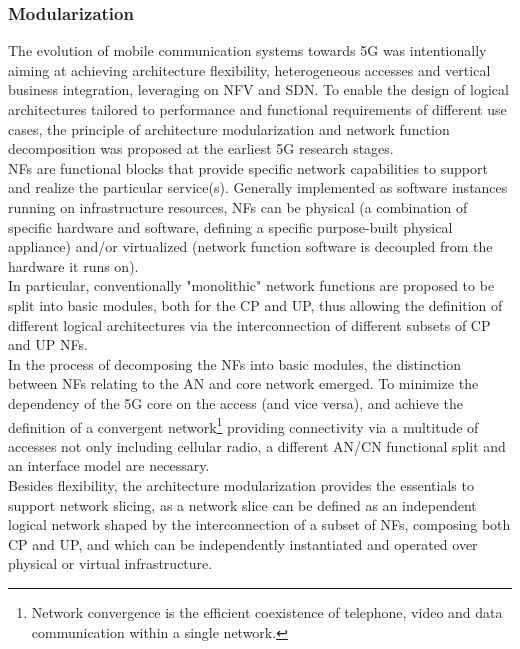 \documentclass{report}
\begin{document}
\subsubsection{Modularization}
The evolution of mobile communication systems towards 5G was intentionally aiming at achieving
architecture flexibility, heterogeneous accesses and vertical business integration, leveraging on NFV and SDN. To enable the design of logical architectures tailored to
performance and functional requirements of different use cases, the principle of architecture
modularization and network function decomposition was proposed at the earliest 5G research
stages.\\ 
\gls{NF}s are functional blocks
that provide specific network capabilities to support and realize the particular service(s). Generally implemented
as software instances running on infrastructure
resources, NFs can be physical (a combination
of specific hardware and software, defining a specific purpose-built physical appliance)
and/or virtualized (network function software is
decoupled from the hardware it runs on). \\
In particular, conventionally "monolithic" network functions are proposed to be split into basic modules, both for the \gls{CP} and \gls{UP}, thus allowing the definition of different logical architectures via the interconnection of
different subsets of CP and UP NFs.\\
In the process of decomposing the NFs into basic modules, the distinction between NFs relating to
the \gls{AN} and core network emerged. To minimize the dependency of the 5G
core on the access (and vice versa), and achieve the definition of a convergent network\footnote{Network convergence is the efficient coexistence of telephone, video and data communication within a single network.} providing
connectivity via a multitude of accesses not only including cellular radio, a different AN/CN functional split and an interface model are necessary.\\
Besides flexibility, the architecture modularization provides the essentials to support network
­slicing, as a network slice can be defined as an independent logical network shaped by the interconnection of a subset of NFs, composing both CP and UP, and which can be independently instantiated
and operated over physical or virtual infrastructure.
\end{document}
